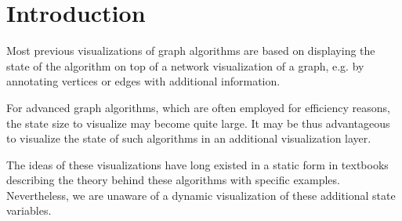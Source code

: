 \chapter{Introduction}\label{ch:1}

Most previous visualizations of graph algorithms \cite{storz2013idp,velden2014idp,sefidgar2015idp,becker2015idp,zoennchen2015idp,fischer2016idp,feil2016idp} are based on displaying the state of the algorithm on top of a network visualization of a graph, e.g. by annotating vertices or edges with additional information.

For advanced graph algorithms, which are often employed for efficiency reasons, the state size to visualize may become quite large. It may be thus advantageous to visualize the state of such algorithms in an additional visualization layer. 

The ideas of these visualizations have long existed in a static form in textbooks describing the theory behind these algorithms with specific examples. Nevertheless, we are unaware of a dynamic visualization of these additional state variables.

